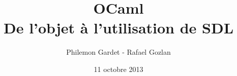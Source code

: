 \documentclass{beamer}
\title{OCaml \\ De l'objet à l'utilisation de SDL}
\author{Philemon Gardet - Rafael Gozlan}
\institute{\texttt{[image: pics/epita.png]}\\\texttt{[image: pics/gconfs.png]}}
\date{11 octobre 2013}
\begin{document}
	\begin{frame}
		\titlepage
	\end{frame}
	
	\begin{frame}
		\tableofcontents
	\end{frame}

	
	
	
	
	
	
	
	
\end{document}
